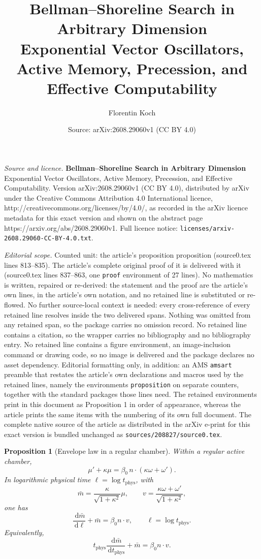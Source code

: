 \documentclass[10pt,a4paper]{amsart}
\title{\textbf{Bellman--Shoreline Search in Arbitrary Dimension}\\[0.35em] \large Exponential Vector Oscillators, Active Memory, Precession, and Effective Computability}
\author{Florentin Koch}
\date{Source: arXiv:2608.29060v1 (CC BY 4.0)}
\newtheorem{proposition}{Proposition}
\newcommand{\dd}{\,\mathrm{d}}
\begin{document}
\maketitle

\noindent\emph{Source and licence.} \textbf{Bellman--Shoreline Search in Arbitrary Dimension}\\[0.35em] \large Exponential Vector Oscillators, Active Memory, Precession, and Effective Computability. Version arXiv:2608.29060v1 (CC BY 4.0), distributed by arXiv under the Creative Commons Attribution 4.0 International licence, http://creativecommons.org/licenses/by/4.0/, as recorded in the arXiv licence metadata for this exact version and shown on the abstract page https://arxiv.org/abs/2608.29060v1. Full licence notice: \texttt{licenses/arxiv-2608.29060-CC-BY-4.0.txt}.\par\smallskip

\noindent\textit{Editorial scope.} Counted unit: the article's proposition proposition (source0.tex lines 813--835). The article's complete original proof of it is delivered with it (source0.tex lines 837--863, one \texttt{proof} environment of 27 lines). No mathematics is written, repaired or re-derived: the statement and the proof are the article's own lines, in the article's own notation, and no retained line is substituted or re-flowed.  No further source-local context is needed: every cross-reference of every retained line resolves inside the two delivered spans.  Nothing was omitted from any retained span, so the package carries no omission record.  No retained line contains a citation, so the wrapper carries no bibliography and no bibliography entry.  No retained line contains a figure environment, an image-inclusion command or drawing code, so no image is delivered and the package declares no asset dependency.  Editorial formatting only, in addition: an AMS \texttt{amsart} preamble that restates the article's own declarations and macros used by the retained lines, namely the environments \texttt{proposition} on separate counters, together with the standard packages those lines need.  The retained environments print in this document as Proposition 1 in order of appearance, whereas the article prints the same items with the numbering of its own full document.  The complete native source of the article as distributed in the arXiv e-print for this exact version is bundled unchanged as \texttt{sources/208827/source0.tex}.
\begin{proposition}[Envelope law in a regular chamber]
Within a regular active chamber,
\[
  \mu'+\kappa\mu
  =\beta_0\,n\cdot(\kappa\omega+\omega').
\]
In logarithmic physical time $\ell=\log t_{\mathrm{phys}}$, with
\[
  \bar m=\frac{\kappa}{\sqrt{1+\kappa^2}}\mu,
  \qquad
  v=\frac{\kappa\omega+\omega'}{\sqrt{1+\kappa^2}},
\]
one has
\[
  \frac{\dd\bar m}{\dd\ell}+\bar m=\beta_0n\cdot v,
  \qquad \ell=\log t_{\mathrm{phys}}.
\]
Equivalently,
\[
  t_{\mathrm{phys}}\frac{\dd\bar m}{\dd t_{\mathrm{phys}}}+\bar m
  =\beta_0n\cdot v.
\]
\end{proposition}
\end{document}
